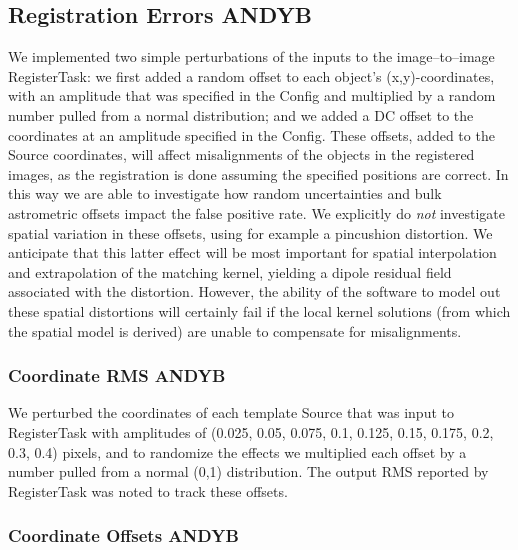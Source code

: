 \documentclass[prd, nofootinbib, floatfix, 11pt,tightenlines,times]{article}
\begin{document}
\subsection{Registration Errors {\bf ANDYB}}

We implemented two simple perturbations of the inputs to the
image--to--image RegisterTask: we first added a random offset to each
object's (x,y)-coordinates, with an amplitude that was specified in
the Config and multiplied by a random number pulled from a normal
distribution; and we added a DC offset to the coordinates at an
amplitude specified in the Config.  These offsets, added to the Source
coordinates, will affect misalignments of the objects in the
registered images, as the registration is done assuming the specified
positions are correct.  In this way we are able to investigate how
random uncertainties and bulk astrometric offsets impact the false
positive rate.  We explicitly do {\it not} investigate spatial
variation in these offsets, using for example a pincushion distortion.
We anticipate that this latter effect will be most important for
spatial interpolation and extrapolation of the matching kernel,
yielding a dipole residual field associated with the distortion.
However, the ability of the software to model out these spatial
distortions will certainly fail if the local kernel solutions (from
which the spatial model is derived) are unable to compensate for
misalignments.


\subsubsection{Coordinate RMS {\bf ANDYB}}

We perturbed the coordinates of each template Source that was input to
RegisterTask with amplitudes of (0.025, 0.05, 0.075, 0.1, 0.125, 0.15,
0.175, 0.2, 0.3, 0.4) pixels, and to randomize the effects we
multiplied each offset by a number pulled from a normal (0,1)
distribution.  The output RMS reported by RegisterTask was noted to
track these offsets.


\subsubsection{Coordinate Offsets {\bf ANDYB}}
\end{document}
